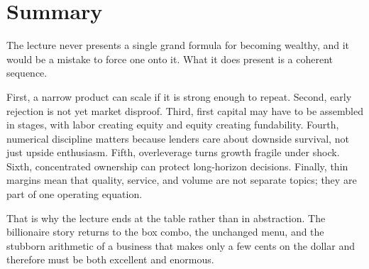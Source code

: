 \section{Summary}

The lecture never presents a single grand formula for becoming wealthy, and it would be a mistake to force one onto it. What it does present is a coherent sequence.

First, a narrow product can scale if it is strong enough to repeat. Second, early rejection is not yet market disproof. Third, first capital may have to be assembled in stages, with labor creating equity and equity creating fundability. Fourth, numerical discipline matters because lenders care about downside survival, not just upside enthusiasm. Fifth, overleverage turns growth fragile under shock. Sixth, concentrated ownership can protect long-horizon decisions. Finally, thin margins mean that quality, service, and volume are not separate topics; they are part of one operating equation.

That is why the lecture ends at the table rather than in abstraction. The billionaire story returns to the box combo, the unchanged menu, and the stubborn arithmetic of a business that makes only a few cents on the dollar and therefore must be both excellent and enormous.